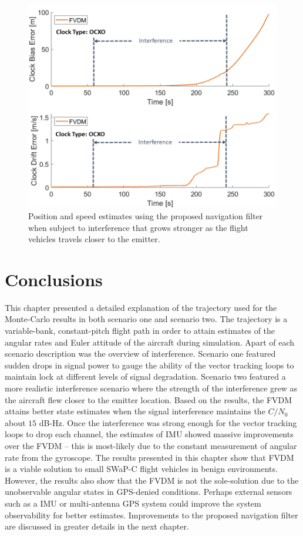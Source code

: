 \begin{figure}[!ht]
    \centering
    \includegraphics[width=0.75\linewidth]{Figures/Results/trajectoryfigure/Slide25.PNG}
    \caption{Position and speed estimates using the proposed navigation filter when subject to interference that grows stronger as the flight vehicles travels closer to the emitter.}\label{fig:ClkScene2}
\end{figure}

\clearpage
\section{\textbf{Conclusions}}

This chapter presented a detailed explanation of the trajectory used for the Monte-Carlo results in both scenario one and scenario two. The trajectory is a variable-bank, constant-pitch flight path in order to attain estimates of the angular rates and Euler attitude of the aircraft during simulation. Apart of each scenario description was the overview of interference. Scenario one featured sudden drops in signal power to gauge the ability of the vector tracking loops to maintain lock at different levels of signal degradation. Scenario two featured a more realistic interference scenario where the strength of the interference grew as the aircraft flew closer to the emitter location. Based on the results, the FVDM attains better state estimates when the signal interference maintains the \(C/N_0\) about \(15\) dB-Hz. Once the interference was strong enough for the vector tracking loops to drop each channel, the estimates of IMU showed massive improvements over the FVDM {--} this is most-likely due to the constant measurement of angular rate from the gyroscope. The results presented in this chapter show that FVDM is a viable solution to small SWaP-C flight vehicles in benign environments. However, the results also show that the FVDM is not the sole-solution due to the unobservable angular states in GPS-denied conditions. Perhaps external sensors such as a IMU or multi-antenna GPS system could improve the system observability for better estimates. Improvements to the proposed navigation filter are discussed in greater details in the next chapter.